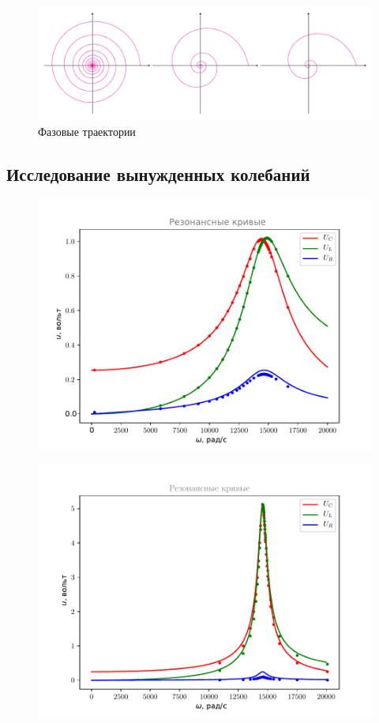 \begin{figure}[H]
	\centering
	\includegraphics[]{plot/1e}
	\caption{Фазовые траектории}
	\label{fig:figure2}
\end{figure}


\subsection{Исследование вынужденных колебаний}
\begin{figure}[H]
	\centering
	\includegraphics[width=0.86\linewidth]{plot/r2400}
	\label{fig:figure3}
\end{figure}
\begin{figure}[H]
	\centering
	\includegraphics[width=0.86\linewidth]{plot/r100}
	\label{fig:figure4}
\end{figure}


